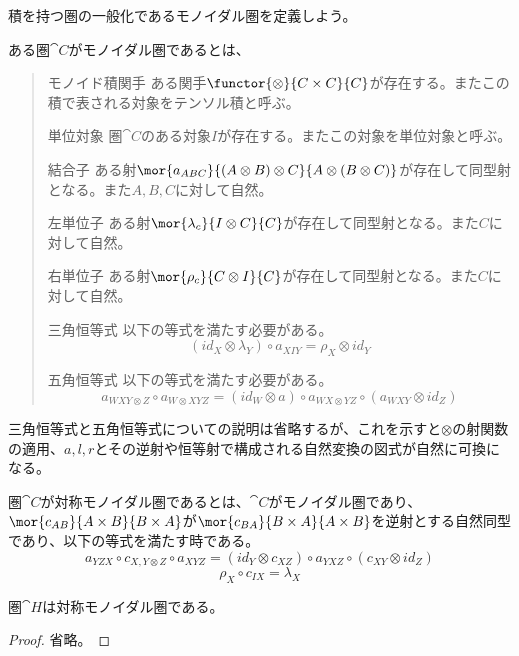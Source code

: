 \documentclass[uplatex,dvipdfmx]{jsarticle}
\begin{document}
  積を持つ圏の一般化であるモノイダル圏を定義しよう。
  \begin{define}[モノイダル圏]\label{def-monoidal-cat}
    ある圏$\cat{C}$がモノイダル圏であるとは、
    \begin{quote}
      \begin{mydescription}
        \item[モノイド積関手]
        ある関手$\functor{\otimes}{C\times C}{C}$が存在する。またこの積で表される対象をテンソル積と呼ぶ。
        \item[単位対象]圏$\cat{C}$のある対象$I$が存在する。またこの対象を単位対象と呼ぶ。
        \item[結合子]ある射$\mor{a_{ABC}}{(A\otimes B)\otimes C}{A\otimes(B\otimes C)}$が存在して同型射となる。また$A,B,C$に対して自然。
        \item[左単位子]ある射$\mor{\lambda_c}{I\otimes C}{C}$が存在して同型射となる。また$C$に対して自然。
        \item[右単位子]ある射$\mor{\rho_c}{C\otimes I}{C}$が存在して同型射となる。また$C$に対して自然。
        \item[三角恒等式]以下の等式を満たす必要がある。
        \[(id_X\otimes \lambda_Y)\circ a_{XIY}=\rho_X\otimes id_Y\]
        \item[五角恒等式]以下の等式を満たす必要がある。
        \[a_{WXY\otimes Z}\circ a_{W\otimes XYZ}=(id_W\otimes a)\circ a_{WX\otimes YZ}\circ(a_{WXY}\otimes id_Z) \]
      \end{mydescription}
    \end{quote}
  \end{define}
  三角恒等式と五角恒等式についての説明は省略するが、これを示すと$\otimes$の射関数の適用、$a,l,r$とその逆射や恒等射で構成される自然変換の図式が自然に可換になる。
  \begin{define}[対称モノイダル圏]\label{def-symmetric-monoidal-cat}
    圏$\cat{C}$が対称モノイダル圏であるとは、$\cat{C}$がモノイダル圏であり、$\mor{c_{AB}}{A\times B}{B\times A}$が$\mor{c_{BA}}{B\times A}{A\times B}$を逆射とする自然同型であり、以下の等式を満たす時である。
    \[a_{YZX}\circ c_{X,Y\otimes Z}\circ a_{XYZ}=(id_Y\otimes c_{XZ})\circ a_{YXZ}\circ(c_{XY}\otimes id_Z)\]
    \[\rho_{X}\circ c_{IX} = \lambda_{X}\]
  \end{define}
  \begin{prop}\label{prop-h-is-smc}
    圏$\cat{H}$は対称モノイダル圏である。
  \end{prop}
  \begin{proof}
    省略。
  \end{proof}
  
  
\end{document}

